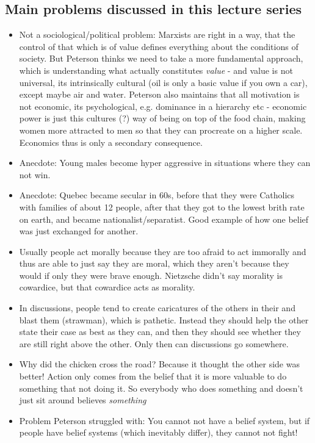 \documentclass[emulatestandardclasses]{scrartcl}
\begin{document}
\subsection{Main problems discussed in this lecture series}

\begin{itemize}
  \item Not a sociological/political problem: Marxists are right in a way, that the control of that which is of value defines everything about the conditions of society. But Peterson thinks we need to take a more fundamental approach, which is understanding what actually constitutes \emph{value} - and value is not universal, its intrinsically cultural (oil is only a basic value if you own a car), except maybe air and water. Peterson also maintains that all motivation is not economic, its psychological, e.g. dominance in a hierarchy etc - economic power is just this cultures (?) way of being on top of the food chain, making women more attracted to men so that they can procreate on a higher scale. Economics thus is only a secondary consequence.
  \item Anecdote: Young males become hyper aggressive in situations where they can not win.
  \item Anecdote: Quebec became secular in 60s, before that they were Catholics with families of about 12 people, after that they got to the lowest brith rate on earth, and became nationalist/separatist. Good example of how one belief was just exchanged for another.
  \item Usually people act morally because they are too afraid to act immorally and thus are able to just say they are moral, which they aren't because they would if only they were brave enough. Nietzsche didn't say morality is cowardice, but that cowardice acts as morality.
  \item In discussions, people tend to create caricatures of the others in their and blast them (strawman), which is pathetic. Instead they should help the other state their case as best as they can, and then they should see whether they are still right above the other. Only then can discussions go somewhere.
  \item Why did the chicken cross the road? Because it thought the other side was better! Action only comes from the belief that it is more valuable to do something that not doing it. So everybody who does something and doesn't just sit around believes \emph{something}
  \item Problem Peterson struggled with: You cannot not have a belief system, but if people have belief systems (which inevitably differ), they cannot not fight!

\end{itemize}
\end{document}
